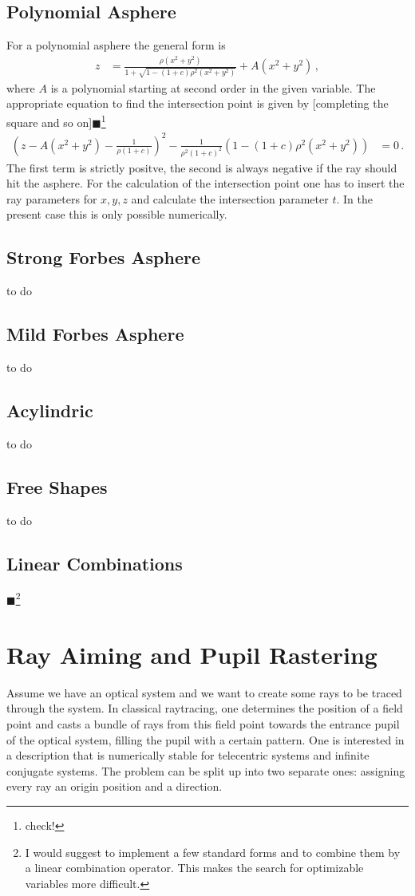 \documentclass[12pt,a4paper,twoside,openright,BCOR10mm,headsepline,titlepage,abstracton,chapterprefix,final]{scrreprt}
\newcommand{\remark}[1]{{\color{red}$\blacksquare$}\footnote{{\color{red}#1}}}
\begin{document}
\subsection{Polynomial Asphere}

For a polynomial asphere the general form is
\begin{align}
  z &=  \frac
 { \rho ( x^2 + y^2 ) }
 { 1 + \sqrt{1 - (1+c) \rho^2  (x^2 + y^2)} } + A(x^2 + y^2)\,,
\end{align}
where $A$ is a polynomial starting at second order in the given variable.
The appropriate equation to find the intersection point is given by [completing the square and so on]\remark{check!}
\begin{align}
 \left(z - A(x^2 + y^2) - \frac{1}{\rho(1+c)}\right)^2 - \frac{1}{\rho^2 (1+c)^2} \left(1 -(1+c)\rho^2 (x^2 + y^2) \right) &= 0\,.
\end{align}
The first term is strictly positve, the second is always negative if the ray should hit the asphere. For the calculation
of the intersection point one has to insert the ray parameters for $x, y, z$ and calculate the intersection parameter $t$.
In the present case this is only possible numerically. 


\subsection{Strong Forbes Asphere}
to do
\subsection{Mild Forbes Asphere}
to do
\subsection{Acylindric}
to do

\subsection{Free Shapes}
to do

\subsection{Linear Combinations}
\remark{I would suggest to implement a few standard forms and to combine them by a linear combination operator. This makes the search for optimizable
variables more difficult.}

\section{Ray Aiming and Pupil Rastering}
Assume we have an optical system and we want to create some rays to be traced through the system. 
In classical raytracing, one determines the position of a field point and casts a bundle of rays from this field point towards the entrance pupil of the optical system, filling the pupil with a certain pattern.
One is interested in a description that is numerically stable for telecentric systems and infinite conjugate systems.
The problem can be split up into two separate ones: assigning every ray an origin position and a direction.
\end{document}
